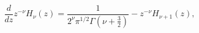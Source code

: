 \begin{equation}
\frac{d}{dz}z^{-\nu }H_{\nu }\left(z\right)=\frac{1}{2^{\nu }\pi ^{1/2}\Gamma \left(\nu +\frac{3}{2}\right)}-z^{-\nu }H_{\nu +1}\left(z\right),\end{equation}

